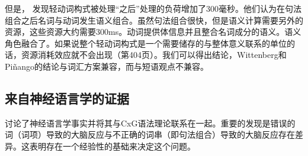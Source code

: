 \begin{exe}
\begin{xlist}[iv.]
\begin{exe}
\begin{xlist}[iv.]
但是， \citet{WP2011a}发现轻动词构式被处理“之后”处理的负荷增加了300毫秒。他们认为在句法组合之后名词与动词发生语义组合。虽然句法组合很快，但是语义计算需要另外的资源，这些资源大约需要300ms。动词提供体信息并且整合名词成分的语义。语义角色融合了。如果说整个轻动词构式是一个需要储存的与整体意义联系的单位的话，资源消耗效应就不会出现（第404页）。我们可以得出结论，Wittenberg和Piñango的结论与词汇方案兼容，而与短语观点不兼容。

\subsection{来自神经语言学的证据}
\label{sec-neuro-linguistics}

\mbox{} \citet*{PCShandbookCxG}讨论了神经语言学事实并将其与CxG语法理论联系在一起。重要的发现是错误的词（词项）导致的大脑反应与不正确的词串（即句法组合）导致的大脑反应存在差异。这表明存在一个经验性的基础来决定这个问题。


\end{xlist}
\end{exe}
\end{xlist}
\end{exe}
